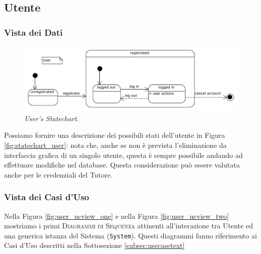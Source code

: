 \subsection{Utente}
\subsubsection{Vista dei Dati}
\begin{figure}
\includegraphics[scale=0.7]{svgs/statechart_user}
\caption{\textit{User's Statechart}.}
\label{fig:statechart_user}
\end{figure}
Possiamo fornire una descrizione dei possibili stati dell'utente in
Figura \vref{fig:statechart_user}: nota che, anche se non è prevista
l'eliminazione da interfaccia grafica di un singolo utente, questa è
sempre possibile andando ad effettuare modifiche nel database. Questa
considerazione può essere valutata anche per le credenziali del Tutore.

\subsubsection{Vista dei Casi d'Uso}
Nella Figura \vref{fig:user_ucview_one} e nella Figura \vref{fig:user_ucview_two} 
mostriamo i primi \textsc{Diagrammi di 
Sequenza} attinenti all'interazione tra Utente ed una generica istanza
del Sistema (\texttt{System}). Questi diagrammi fanno riferimento
ai Casi d'Uso descritti nella Sottosezione \vref{subsec:usecasetext}

